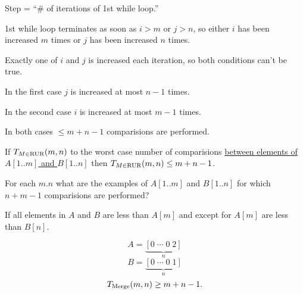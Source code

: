 \documentclass[11pt, cyan, night, 0.5in]{hw}
\begin{document}
\np

Step = ``\# of iterations of 1st while loop.''

1st while loop terminates as soon as $i>m$ or $j>n$, so either $i$ has been increased $m$ times or $j$ has been increased $n$ times.

Exactly one of $i$ and $j$ is increased each iteration, so both conditions can't be true.

In the first case $j$ is increased at most $n-1$ times.

In the second case $i$ is increased at most $m-1$ times.

In both cases $\le m+n-1$ comparisions are performed.

If $T_{M\in\text{RUR}}(m,n)$ to the worst case number of comparisions \underline{between elements of $A[1..m]$ and $B[1..n]$} then $T_{M\in\text{RUR}}(m,n)\le m+n-1$.


For each $m.n$ what are the examples of $A[1..m]$ and $B[1..n]$ for which $n+m-1$ comparisions are performed?

If all elements in $A$ and $B$ are less than $A[m]$ and except for $A[m]$ are less than $B[n]$.

\[A=\underbrace{[0\;\cdots\;0\;2]}_{n}\]
\[B=\underbrace{[0\;\cdots\;0\;1]}_{n}\]
\[T_{\text{Merge}}(m,n)\geq m+n-1.\]

\begin{algorithm}
    \begin{algorithmic}
    \end{algorithmic}
\end{algorithm}

\end{document}
